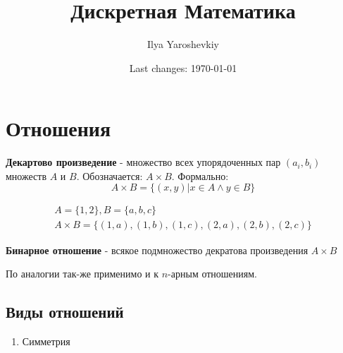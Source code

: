 
\usepackage{langcode}
\usepackage{xunicode}
\usepackage{xltxtra}
\usepackage{pdfpages}
\usepackage[utf8]{inputenc}
\usepackage[russian, english]{babel}



    \title{Дискретная Математика}
    \author{Ilya Yaroshevkiy}
    \date{Last changes: \today}
    \maketitle
\section{Отношения}
    \begin{definition}
        \textbf{Декартово произведение} - множество всех упорядоченных пар $(a_i,b_i)$ множеств $A$ и $B$. Обозначается: $A \times B$. Формально:
        $$A \times B = \{(x,y) \vert x \in A \land y \in B\}$$
    \end{definition}
    \begin{example}
        \begin{align*}
            A = \{1,2\}, B = \{a,b,c\} \\
            A \times B = \{(1,a),(1,b),(1,c),(2,a),(2,b),(2,c)\}        
        \end{align*}
    \end{example}
    \begin{definition}
        \textbf{Бинарное отношение} - всякое подмножество декратова произведения $A \times B$
    \end{definition}
    \begin{remark}
        По аналогии так-же применимо и к $n$-арным отношениям.
    \end{remark}
    \subsection{Виды отношений}
    \begin{enumerate}
        \item Симметрия

    \end{enumerate}

